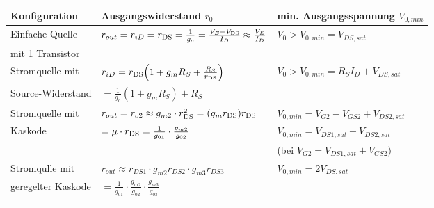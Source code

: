 \begin{tabular}{|l|l|l|}
    \hline
    \textbf{Konfiguration}  & \textbf{Ausgangswiderstand $r_0$}     & \textbf{min. Ausgangsspannung $V_{0,min}$} \\
    \hline
    Einfache Quelle      & $r_{out} = r_{iD} = r_{\rm DS} = \frac{1}{g_o}= \frac{V_E+V_{\rm DS}}{I_D}\approx\frac{V_E}{I_D}$ & $V_0 > V_{0,min} = V_{DS,sat}$ \\
    mit 1 Transistor     &  & \\
    \hline
    Stromquelle mit      & $r_{iD} = r_{\rm DS}\Bigl(1+g_m R_S+\frac{R_S}{r_{\rm DS}}\Bigr)$ & $V_0 > V_{0,min} = R_S I_D + V_{DS,sat}$ \\
    Source-Widerstand    & $= \frac{1}{g_o}(1+g_m R_S)+R_S$ & \\
    \hline
    Stromquelle mit      & $r_{out} = r_{o2}\approx g_{m2}\cdot r_{\rm DS}^2 = (g_m r_{\rm DS})r_{\rm DS}$ & $V_{0,min} = V_{G2}-V_{GS2}+V_{DS2,sat}$\\
    Kaskode              & $= \mu\cdot r_{\rm DS} = \frac{1}{g_{01}}\cdot\frac{g_{m2}}{g_{02}}$ & $V_{0,min} = V_{DS1,sat}+V_{DS2,sat}$ \\
        &   & (bei $V_{G2} = V_{DS1,sat} +V_{GS2})$ \\
    \hline
    Stromqulle mit       & $r_{out}\approx r_{DS1}\cdot g_{m2}r_{DS2}\cdot g_{m3}r_{DS3}$ & $V_{0,min} = 2 V_{DS,sat}$\\
    geregelter Kaskode   & $=\frac{1}{g_{01}}\cdot\frac{g_{m2}}{g_{02}}\cdot\frac{g_{m3}}{g_{03}}$ &  \\
        & & \\
    \hline
\end{tabular}\newpage
